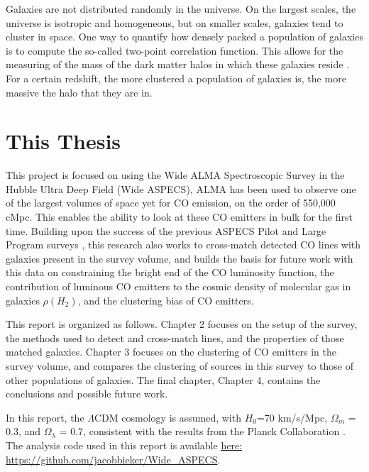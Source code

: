 \documentclass[twoside,single]{lion-msc}
\begin{document}
Galaxies are not distributed randomly in the universe. On the largest scales, the universe is isotropic and homogeneous, but on smaller scales, galaxies tend to cluster in space. One way to quantify how densely packed a population of galaxies is to compute the so-called two-point correlation function. This allows for the measuring of the mass of the dark matter halos in which these galaxies reside \cite{hickox2011clustering}. For a certain redshift, the more clustered a population of galaxies is, the more massive the halo that they are in.

\section{This Thesis}

This project is focused on using the Wide ALMA Spectroscopic Survey in the Hubble Ultra Deep Field (Wide ASPECS), ALMA has been used to observe one of the largest volumes of space yet for CO emission, on the order of 550,000 cMpc. This enables the ability to look at these CO emitters in bulk for the first time. Building upon the success of the previous ASPECS Pilot and Large Program surveys \cite{walter2016alma, decarli2019alma}, this research also works to cross-match detected CO lines with galaxies present in the survey volume, and builds the basis for future work with this data on constraining the bright end of the CO luminosity function, the contribution of luminous CO emitters to the cosmic density of molecular gas in galaxies $\rho(H_2)$, and the clustering bias of CO emitters.

This report is organized as follows. Chapter 2 focuses on the setup of the survey, the methods used to detect and cross-match lines, and the properties of those matched galaxies. Chapter 3 focuses on the clustering of CO emitters in the survey volume, and compares the clustering of sources in this survey to those of other populations of galaxies. The final chapter, Chapter 4, contains the conclusions and possible future work. 

In this report, the $\Lambda$CDM cosmology is assumed, with $H_0$=70 km/s/Mpc, $\Omega_m$ = 0.3, and $\Omega_{\lambda}$ = 0.7, consistent with the results from the Planck Collaboration \cite{ade2016planck}. The analysis code used in this report is available \href{https://github.com/jacobbieker/Wide\_ASPECS}{here: https://github.com/jacobbieker/Wide\_ASPECS}. 




\end{document}
